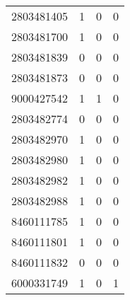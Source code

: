 \begin{tabular}[ht]{|l|c|c|c|}
2803481405  &   1   &   0   &   0   \\ 
2803481700  &   1   &   0   &   0   \\ 
2803481839  &   0   &   0   &   0   \\ 
2803481873  &   0   &   0   &   0   \\ 
9000427542  &   1   &   1   &   0   \\ 
2803482774  &   0   &   0   &   0   \\ 
2803482970  &   1   &   0   &   0   \\ 
2803482980  &   1   &   0   &   0   \\ 
2803482982  &   1   &   0   &   0   \\ 
2803482988  &   1   &   0   &   0   \\ 
8460111785  &   1   &   0   &   0   \\ 
8460111801  &   1   &   0   &   0   \\ 
8460111832  &   0   &   0   &   0   \\ 
6000331749  &   1   &   0   &   1   \\ 
  \hline
\end{tabular}



